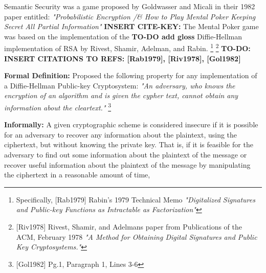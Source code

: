Semantic Security was a game proposed by Goldwasser and Micali in their 1982 paper entitled: \textit{"Probabilistic Encryption /& How to Play Mental Poker Keeping Secret All Partial Information"} 
\newline
\textbf{INSERT CITE-KEY:} 
\newline
The Mental Poker game was based on the implementation of the \textbf{TO-DO add gloss} Diffie-Hellman implementation of RSA by Rivest, Shamir, Adelman, and Rabin.
\footnote{Specifically, [Rab1979] Rabin's 1979 Technical Memo \textit{"Digitalized Signatures and Public-key Functions as Intractable as Factorization"}}
\footnote{[Riv1978] Rivest, Shamir, and Adelmans paper from Publications of the ACM, February 1978 \textit{"A Method for Obtaining Digital Signatures and Public Key Cryptosystems."}}
\textbf{TO-DO: INSERT CITATIONS TO REFS: [Rab1979], [Riv1978], [Gol1982]}

\textbf{Formal Definition:}
\newline
[Gol1982] Proposed the following property for any implementation of a Diffie-Hellman Public-key Cryptosystem:  \textit{"An adversary, who knows the encryption of an algorithm and is given the cypher text, cannot obtain any information about the cleartext."} \footnote{[Gol1982] Pg.1, Paragraph 1, Lines 3-6} 

\newline

\textbf{Informally:}
\newline
A given cryptographic scheme is considered insecure if it is possible for an adversary to recover any information about the plaintext, using the ciphertext, but without knowing the private key. That is, if it is feasible for the adversary to find out some information about the plaintext of the message or recover useful information about the plaintext of the message by manipulating the ciphertext in a reasonable amount of time, 


